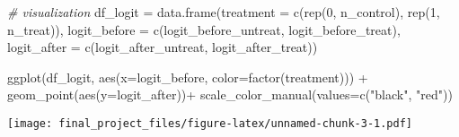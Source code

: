 \documentclass[
]{article}
\newenvironment{Shaded}{\begin{snugshade}}{\end{snugshade}}
\newcommand{\AttributeTok}[1]{\textcolor[rgb]{0.77,0.63,0.00}{#1}}
\newcommand{\CommentTok}[1]{\textcolor[rgb]{0.56,0.35,0.01}{\textit{#1}}}
\newcommand{\DecValTok}[1]{\textcolor[rgb]{0.00,0.00,0.81}{#1}}
\newcommand{\FunctionTok}[1]{\textcolor[rgb]{0.00,0.00,0.00}{#1}}
\newcommand{\NormalTok}[1]{#1}
\newcommand{\OtherTok}[1]{\textcolor[rgb]{0.56,0.35,0.01}{#1}}
\newcommand{\SpecialCharTok}[1]{\textcolor[rgb]{0.00,0.00,0.00}{#1}}
\newcommand{\StringTok}[1]{\textcolor[rgb]{0.31,0.60,0.02}{#1}}
\begin{document}
\begin{Shaded}
\begin{Highlighting}[]
\CommentTok{\# visualization}
\NormalTok{df\_logit }\OtherTok{=} \FunctionTok{data.frame}\NormalTok{(}\AttributeTok{treatment =} \FunctionTok{c}\NormalTok{(}\FunctionTok{rep}\NormalTok{(}\DecValTok{0}\NormalTok{, n\_control), }\FunctionTok{rep}\NormalTok{(}\DecValTok{1}\NormalTok{, n\_treat)),}
                      \AttributeTok{logit\_before =} \FunctionTok{c}\NormalTok{(logit\_before\_untreat, logit\_before\_treat),}
                      \AttributeTok{logit\_after =} \FunctionTok{c}\NormalTok{(logit\_after\_untreat, logit\_after\_treat))}

\FunctionTok{ggplot}\NormalTok{(df\_logit, }\FunctionTok{aes}\NormalTok{(}\AttributeTok{x=}\NormalTok{logit\_before, }\AttributeTok{color=}\FunctionTok{factor}\NormalTok{(treatment))) }\SpecialCharTok{+}
  \FunctionTok{geom\_point}\NormalTok{(}\FunctionTok{aes}\NormalTok{(}\AttributeTok{y=}\NormalTok{logit\_after))}\SpecialCharTok{+} 
  \FunctionTok{scale\_color\_manual}\NormalTok{(}\AttributeTok{values=}\FunctionTok{c}\NormalTok{(}\StringTok{"black"}\NormalTok{, }\StringTok{"red"}\NormalTok{))}
\end{Highlighting}
\end{Shaded}

\texttt{[image: final\_project\_files/figure-latex/unnamed-chunk-3-1.pdf]}
\end{document}
